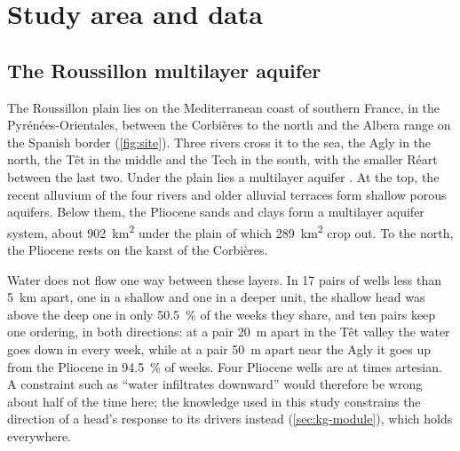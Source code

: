 \section{Study area and data}\label{sec:data}

\subsection{The Roussillon multilayer aquifer}\label{sec:site}

The Roussillon plain lies on the Mediterranean coast of southern France, in the Pyr\'en\'ees-Orientales,
between the Corbi\`eres to the north and the Albera range on the Spanish border (\cref{fig:site}). Three
rivers cross it to the sea, the Agly in the north, the T\^et in the middle and the Tech in the south,
with the smaller R\'eart between the last two. Under the plain lies a multilayer aquifer
\citep{Caballero2015Impact}. At the top, the recent alluvium of the four rivers and older alluvial
terraces form shallow porous aquifers. Below them, the Pliocene sands and clays form a multilayer
aquifer system, about \SI{902}{km^2} under the plain of which
\SI{289}{km^2} crop out. %
To the north, the Pliocene rests on the karst of the Corbi\`eres.

Water does not flow one way between these layers. In 17 pairs of wells less than \SI{5}{km} apart,
one in a shallow and one in a deeper unit, the shallow head was above the deep one in only
\SI{50.5}{\percent} of the weeks they share, and ten pairs keep one ordering, in both directions: at a
pair \SI{20}{m} apart in the T\^et valley the water goes down in every week, while at a pair
\SI{50}{m} apart near the Agly it goes up from the Pliocene in \SI{94.5}{\percent} of weeks.
Four Pliocene wells are at times artesian. A constraint such as ``water infiltrates downward'' would
therefore be wrong about half of the time here; the knowledge used in this study constrains the
direction of a head's response to its drivers instead (\cref{sec:kg-module}), which holds everywhere.

